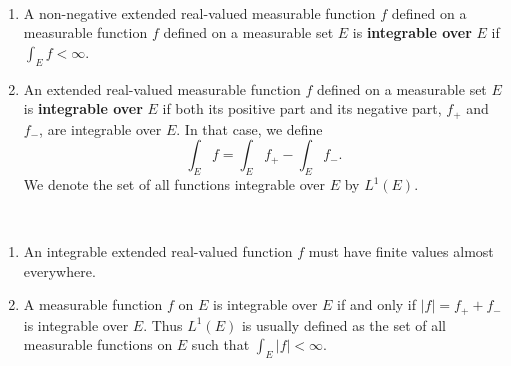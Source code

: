 \begin{defn}%
	~
	\begin{enumerate}
	\item A non-negative extended real-valued measurable function $f$ defined on a 
	measurable function $f$ defined on a measurable set $E$ is \textbf{integrable over} 
	$E$ if $\int_Ef<\infty$. 
	\item An extended real-valued measurable function $f$ defined on a measurable 
	set $E$ is \textbf{integrable over} $E$ if both its positive part and its 
	negative part, $f_+$ and $f_-$, are integrable over $E$. In that case, we define 
	\begin{equation*}
		\int_E f = \int_Ef_+-\int_Ef_-.
	\end{equation*}
	We denote the set of all functions integrable over $E$ by $L^1(E)$. 
	\end{enumerate}
\end{defn}

\begin{rmk}%
~
\begin{enumerate}
	\item An integrable extended real-valued function $f$ must have finite values 
	almost everywhere. 
	\item A measurable function $f$ on $E$ is integrable over $E$ if and only if 
	$|f| = f_++f_-$ is integrable over $E$. Thus $L^1(E)$ is usually defined as the 
	set of all measurable functions on $E$ such that $\int_E|f|<\infty$. 
\end{enumerate}
\end{rmk}

